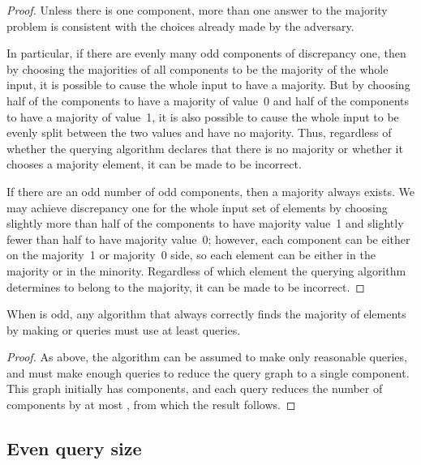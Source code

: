 \documentclass[11pt]{llncs}
\begin{document}
\begin{proof}
Unless there is one component, more than one answer to the majority problem  is consistent with the choices already made by the adversary.

In particular, if there are evenly many odd components of discrepancy one, then by choosing the majorities of all components to be the majority of the whole input, it is possible to cause the whole input to have a majority. But by choosing half of the components to have a majority of value~0 and half of the components to have a majority of value~1, it is also possible to cause the whole input to be evenly split between the two values and have no majority. Thus, regardless of whether the querying algorithm declares that there is no majority or whether it chooses a majority element, it can be made to be incorrect.

If there are an odd number of odd components, then a majority always exists. We may achieve discrepancy one for the whole input set of elements by choosing slightly more than half of the components to have majority value~1 and slightly fewer than half to have majority value~0; however, each component can be either on the majority~1 or majority~0 side, so each element can be either in the majority or in the minority. Regardless of which element the querying algorithm determines to belong to the majority, it can be made to be incorrect.
\end{proof}

\begin{theorem}
\label{thm:odd-lb}
When  is odd, any algorithm that always correctly finds the majority of  elements by making  or  queries must use at least  queries.
\end{theorem}

\begin{proof}
As above, the algorithm can be assumed to make only reasonable  queries, and must make enough queries to reduce the query graph to a single component. This graph initially has  components, and each query reduces the number of components by at most , from which the result follows.
\end{proof}

\ifFull
\subsection{Even query size}
\fi
\end{document}
